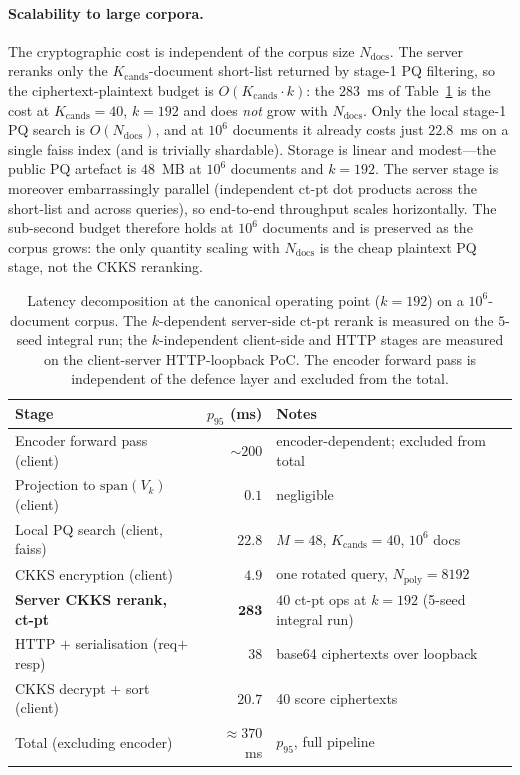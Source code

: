 \documentclass[11pt,a4paper]{article}
\begin{document}
\paragraph{Scalability to large corpora.} The cryptographic cost is
independent of the corpus size $N_{\mathrm{docs}}$. The server reranks only
the $K_{\mathrm{cands}}$-document short-list returned by stage-1 PQ
filtering, so the ciphertext-plaintext budget is
$O(K_{\mathrm{cands}}\cdot k)$: the $283$~ms of Table~\ref{tab:latency} is
the cost at $K_{\mathrm{cands}}=40$, $k=192$ and does \emph{not} grow with
$N_{\mathrm{docs}}$. Only the local stage-1 PQ search is
$O(N_{\mathrm{docs}})$, and at $10^6$ documents it already costs just
$22.8$~ms on a single faiss index (and is trivially shardable). Storage is
linear and modest---the public PQ artefact is $48$~MB at $10^6$ documents
and $k=192$. The server stage is moreover embarrassingly parallel
(independent ct-pt dot products across the short-list and across queries),
so end-to-end throughput scales horizontally. The sub-second budget
therefore holds at $10^6$ documents and is preserved as the corpus grows:
the only quantity scaling with $N_{\mathrm{docs}}$ is the cheap plaintext
PQ stage, not the CKKS reranking.

\begin{table}[tb]
\centering
\caption{Latency decomposition at the canonical operating point
($k = 192$) on a $10^6$-document corpus. The $k$-dependent server-side
ct-pt rerank is measured on the $5$-seed integral run; the $k$-independent
client-side and HTTP stages are measured on the client-server
HTTP-loopback PoC. The encoder forward pass is independent of the defence
layer and excluded from the total.}
\label{tab:latency}
\small
\begin{tabular}{@{}lrl@{}}
\toprule
Stage & $p_{95}$ (ms) & Notes \\ \midrule
Encoder forward pass (client) & $\sim 200$ & encoder-dependent; excluded from total \\
Projection to $\mathrm{span}(V_k)$ (client) & $0.1$ & negligible \\
Local PQ search (client, faiss) & $22.8$ & $M = 48$, $K_{\mathrm{cands}} = 40$, $10^6$ docs \\
CKKS encryption (client) & $4.9$ & one rotated query, $N_{\mathrm{poly}} = 8192$ \\
\textbf{Server CKKS rerank, ct-pt} & $\mathbf{283}$ & $40$ ct-pt ops at $k = 192$ (5-seed integral run) \\
HTTP $+$ serialisation (req$+$resp) & $38$ & base64 ciphertexts over loopback \\
CKKS decrypt + sort (client) & $20.7$ & 40 score ciphertexts \\ \midrule
Total (excluding encoder) & $\approx 370$~ms & $p_{95}$, full pipeline \\
\bottomrule
\end{tabular}
\end{table}
\end{document}
